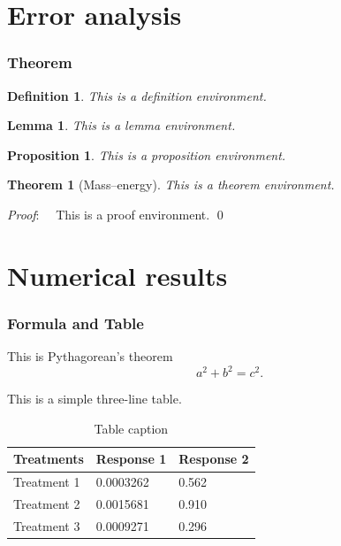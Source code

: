 \documentclass[notheorems,11pt,compress]{beamer}
\newtheorem{theorem}{Theorem}
\numberwithin{theorem}{section}
\newtheorem{definition}{Definition}
\numberwithin{definition}{section}
\newtheorem{lemma}{Lemma}
\numberwithin{lemma}{section}
\newtheorem{proposition}{Proposition}
\numberwithin{proposition}{section}
\numberwithin{corollary}{section}
\theoremstyle{example}
\renewenvironment{proof}[1][Proof]{\textit{#1}:~~}{\qed\par}
\numberwithin{figure}{section}
\numberwithin{table}{section}
\numberwithin{equation}{section}
\begin{document}
\section{Error analysis}

\begin{frame}
\frametitle{Theorem}

\begin{definition}
This is a definition environment.
\end{definition}

\begin{lemma}
This is a lemma environment.
\end{lemma}

\begin{proposition}
This is a proposition environment.
\end{proposition}

\begin{theorem}[Mass--energy]
This is a theorem environment.
\end{theorem}

\begin{proof}
  This is a proof environment.
\end{proof}
\end{frame}


\section{Numerical results}  %


\begin{frame}
\frametitle{Formula and Table}

This is Pythagorean's theorem
\begin{equation}\label{Pythagorean}
  a^2+b^2=c^2.
\end{equation}

This is a simple three-line table.
\begin{table}
\caption{Table caption}
\begin{tabular}{l l l}
\toprule
Treatments & Response 1 & Response 2 \\
\midrule
Treatment 1 & 0.0003262 & 0.562 \\
Treatment 2 & 0.0015681 & 0.910 \\
Treatment 3 & 0.0009271 & 0.296 \\
\bottomrule
\end{tabular}
\end{table}

\end{frame}
\end{document}
